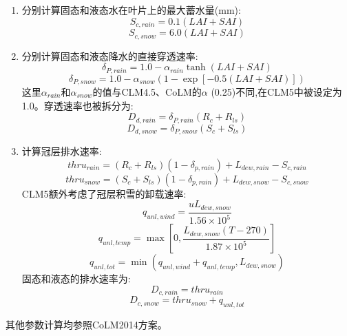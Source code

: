 \begin{enumerate}
\item 分别计算固态和液态水在叶片上的最大蓄水量(mm):
\begin{equation}
S_{c,rain}=0.1(LAI+SAI)
\end{equation}
\begin{equation}
S_{c,snow}=6.0(LAI+SAI)
\end{equation}
\item 分别计算固态和液态降水的直接穿透速率:
\begin{equation}
\delta_{P,rain}=1.0 - \alpha_{rain} \tanh(LAI+SAI)
\end{equation}
\begin{equation}
\delta_{P,snow}=1.0 - \alpha_{snow}({1-\exp[-0.5(LAI+SAI)]})
\end{equation}
这里$\alpha_{rain}$和$\alpha_{snow}$的值与CLM4.5、CoLM的$\alpha$ (0.25)不同,在CLM5中被设定为1.0。穿透速率也被拆分为:
\begin{equation}
D_{d,rain}=\delta_{P,rain}(R_c+R_{ls})
\end{equation}
\begin{equation}
D_{d,snow}=\delta_{P,snow}(S_c+S_{ls})
\end{equation}
\item 计算冠层排水速率:
\begin{equation}
thru_{rain}=(R_c+R_{ls})(1-\delta_{p,rain})+L_{dew,rain}-S_{c,rain}
\end{equation}
\begin{equation}
thru_{snow}=(S_c+S_{ls})(1-\delta_{p,rain})+L_{dew,snow}-S_{c,snow}
\end{equation}
CLM5额外考虑了冠层积雪的卸载速率:
\begin{equation}\label{q_unl_wind}
q_{unl,wind}=\frac{uL_{dew,snow}}{1.56\times 10^5}
\end{equation}
\begin{equation}
q_{unl,temp}=\max\left[0, \frac{L_{dew,snow}(T-270)}{1.87\times 10^5}\right]
\end{equation}
\begin{equation}\label{q_unl_tot}
q_{unl,tot}=\min(q_{unl,wind}+q_{unl,temp},L_{dew,snow})
\end{equation}
固态和液态的排水速率为:
\begin{equation}
D_{c,rain}=thru_{rain}
\end{equation}
\begin{equation}
D_{c,snow}=thru_{snow}+q_{unl,tot}
\end{equation}
\end{enumerate}
其他参数计算均参照CoLM2014方案。



